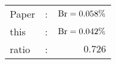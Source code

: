       \begin{tabular}{lcr}
          Paper &:& $\mathrm{Br}  = 0.058\%$ \\
          this      &:& $\mathrm{Br}  = 0.042\%$ \\
		  ratio   &:& $0.726$ \\
      \end{tabular}
